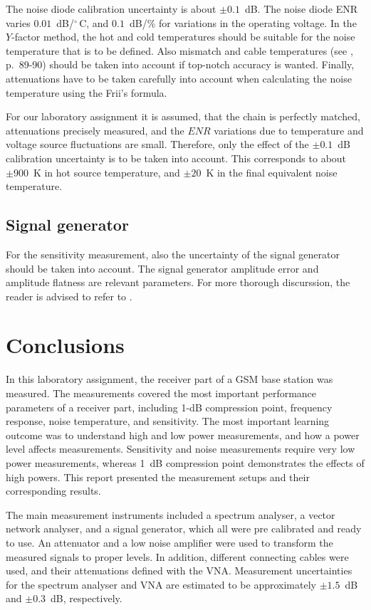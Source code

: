 \documentclass[a4paper, 12pt]{article}
\begin{document}
The noise diode calibration uncertainty is about $\pm0.1$~dB. The noise diode ENR varies 
$0.01$~dB/${}^\circ \mathrm{\,C}$, and $0.1$~dB/\% for variations in the operating voltage. 
In the $Y$-factor method, the hot and cold temperatures should be suitable for the noise 
temperature that is to be defined. Also mismatch and cable temperatures (see \cite{kakkaa_huuleen}, p.\ 89-90) 
should be taken into account if top-notch accuracy is wanted. Finally, attenuations have 
to be taken carefully into account when calculating the noise temperature using the Frii's 
formula.

For our laboratory assignment it is assumed, that the chain is perfectly matched, attenuations 
precisely measured, and the $\mathit{ENR}$ variations due to temperature and voltage source fluctuations 
are small. Therefore, only the effect of the $\pm 0.1$~dB calibration uncertainty is to be 
taken into account. This corresponds to about $\pm900$~K in hot source temperature, and 
$\pm20$~K in the final equivalent noise temperature.


\subsection{Signal generator}

For the sensitivity measurement, also the uncertainty of the signal generator should be taken 
into account. The signal generator amplitude error and amplitude flatness are relevant parameters.
For more thorough discurssion, the reader is advised to refer to \cite{kakkaa_huuleen, sg}.

\newpage
\section{Conclusions}

In this laboratory assignment, the receiver part of a GSM base station was measured. The 
measurements covered the most important performance parameters of a receiver part, including 
1-dB compression point, frequency response, noise temperature, and sensitivity. The most 
important learning outcome was to understand high and low power measurements, and how a 
power level affects measurements. Sensitivity and noise measurements require very low power 
measurements, whereas 1~dB compression point demonstrates the effects of high powers. This 
report presented the measurement setups and their corresponding results.

The main measurement instruments included a spectrum analyser, a vector network analyser, and 
a signal generator, which all were pre calibrated and ready to use. An attenuator and a low 
noise amplifier were used to transform the measured signals to proper levels. In addition, 
different connecting cables were used, and their attenuations defined with the VNA. Measurement 
uncertainties for the spectrum analyser and VNA are estimated to be approximately $\pm1.5$~dB 
and $\pm0.3$~dB, respectively.
\end{document}
